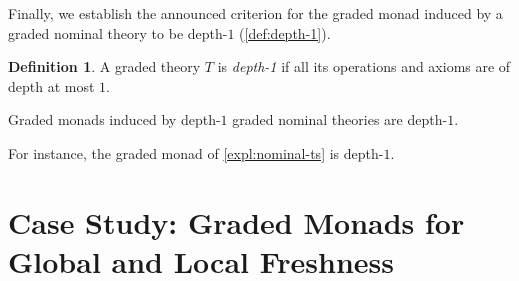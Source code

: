 \documentclass[a4paper,UKenglish,cleveref,thm-restate,numberwithinsect,final]{lipics-v2021}
\theoremstyle{plain}
\numberwithin{equation}{section}
\newcommand{\+}[1]{\mathcal{#1}\xspace}
\theoremstyle{definition}
\newtheorem{defn}[theorem]{Definition}
\begin{document}
\noindent Finally, we establish the announced criterion for the graded
monad induced by a graded nominal theory to be depth-$1$
(\cref{def:depth-1}).
\begin{defn}
  A graded theory \(T\) is \emph{depth-1} if all its operations and
  axioms are of depth at most $1$.
\end{defn}
\begin{theorem}\label{thm:depth1}
  Graded monads induced by depth-$1$ graded nominal theories are
  depth-$1$.
\end{theorem}
\noindent For instance, the graded monad of \cref{expl:nominal-ts} is
depth-$1$.

\section{Case Study: Graded Monads for Global and  Local Freshness}
\label{sec:local-freshness}
\end{document}
